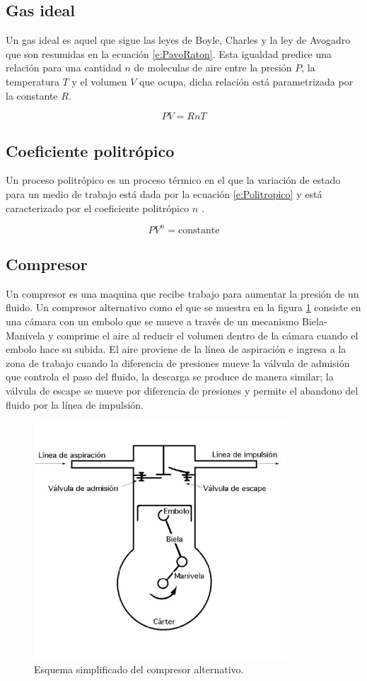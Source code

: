 \documentclass[11pt,letterpaper]{extarticle}        %
\numberwithin{equation}{section}                    %
\begin{document}
\subsection{Gas ideal}
Un gas ideal es aquel que sigue las leyes de Boyle, Charles y la ley de Avogadro \cite[p. 38]{b:Produccion} que son resumidas en la ecuación \ref{e:PavoRaton}. Esta igualdad predice una relación para una cantidad $n$ de moleculas de aire entre la presión $P$, la temperatura $T$ y el volumen $V$ que ocupa, dicha relación está parametrizada por la constante $R$.

\begin{equation}
P V = R n T \label{e:PavoRaton}
\end{equation}

\subsection{Coeficiente politrópico}
Un proceso politrópico es un proceso térmico en el que la variación de estado para un medio de trabajo está dada por la ecuación \ref{e:Politropico} y está caracterizado por el coeficiente politrópico $n$ \cite[p. 65]{b:Produccion}.

\begin{equation}
PV^n=\text{constante}
\label{e:Politropico}
\end{equation}
\subsection{Compresor}
Un compresor es una maquina que recibe trabajo para aumentar la presión de un fluido. Un compresor alternativo como el que se muestra en la figura \ref{f:Esquema} consiste en una cámara con un embolo que se mueve a través de un mecanismo Biela-Manivela y comprime el aire al reducir el volumen dentro de la cámara cuando el embolo hace su subida. El aire proviene de la línea de aspiración e ingresa a la zona de trabajo cuando la diferencia de presiones mueve la válvula de admisión que controla el paso del fluido, la descarga se produce de manera similar; la válvula de escape se mueve por diferencia de presiones y permite el abandono del fluido por la línea de impulsión.

\begin{figure}[H]
\centering
\includegraphics[width=0.5\linewidth]{Esquema}
\caption{Esquema simplificado del compresor alternativo.}
\label{f:Esquema}
\end{figure}
\end{document}
